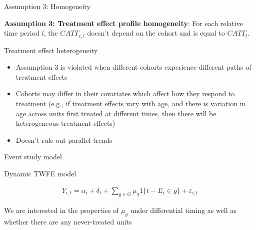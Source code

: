 \documentclass{beamer}
\begin{document}
\begin{frame}{Assumption 3: Homogeneity}

\textbf{Assumption 3: Treatment effect profile homogeneity}: For each relative time period $l$, the $CATT_{e,l}$ doesn't depend on the cohort and is equal to $CATT_l$. 


\end{frame}

\begin{frame}{Treatment effect heterogeneity}

\begin{itemize}
\item Assumption 3 is violated when different cohorts experience different paths of treatment effects
\item Cohorts may differ in their covariates which affect how they respond to treatment (e.g., if treatment effects vary with age, and there is variation in age across units first treated at different times, then there will be heterogeneous treatment effects)
\item Doesn't rule out parallel trends
\end{itemize}

\end{frame}

\begin{frame}{Event study model}

Dynamic TWFE model

\begin{eqnarray*}
Y_{i,t} = \alpha_i + \delta_t + \sum_{g \in G} \mu_g1\{t-E_i \in g \} + \varepsilon_{i,t}
\end{eqnarray*}

\bigskip

We are interested in the properties of $\mu_g$ under differential timing as well as whether there are any never-treated units

\end{frame}
\end{document}
